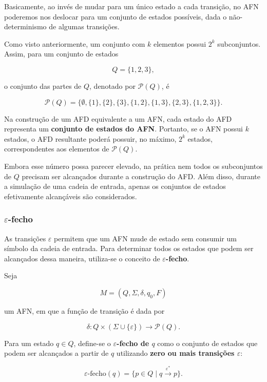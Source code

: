 \documentclass[
  brazilian,
  letterpaper,
]{book}
\theoremstyle{plain}
\theoremstyle{definition}
\theoremstyle{remark}
\begin{document}
Basicamente, ao invés de mudar para um único estado a cada transição, no
AFN poderemos nos deslocar para um conjunto de estados possíveis, dada o
não-determinismo de algumas transições.

Como visto anteriormente, um conjunto com \(k\) elementos possui \(2^k\)
subconjuntos. Assim, para um conjunto de estados

\[
Q=\{1,2,3\},
\]

o conjunto das partes de \(Q\), denotado por \(\mathcal{P}(Q)\), é

\[
\mathcal{P}(Q)=
\{\emptyset,\{1\},\{2\},\{3\},\{1,2\},\{1,3\},\{2,3\},\{1,2,3\}\}.
\]

Na construção de um AFD equivalente a um AFN, cada estado do AFD
representa um \textbf{conjunto de estados do AFN}. Portanto, se o AFN
possui \(k\) estados, o AFD resultante poderá possuir, no máximo,
\(2^k\) estados, correspondentes aos elementos de \(\mathcal{P}(Q)\).

Embora esse número possa parecer elevado, na prática nem todos os
subconjuntos de \(Q\) precisam ser alcançados durante a construção do
AFD. Além disso, durante a simulação de uma cadeia de entrada, apenas os
conjuntos de estados efetivamente alcançáveis são considerados.

\subsubsection{\texorpdfstring{\(\varepsilon\)-fecho}{\textbackslash varepsilon-fecho}}\label{varepsilon-fecho}

As transições \(\varepsilon\) permitem que um AFN mude de estado sem
consumir um símbolo da cadeia de entrada. Para determinar todos os
estados que podem ser alcançados dessa maneira, utiliza-se o conceito de
\textbf{\(\varepsilon\)-fecho}.

Seja

\[
M=(Q,\Sigma,\delta,q_0,F)
\]

um AFN, em que a função de transição é dada por

\[
\delta:Q\times(\Sigma\cup\{\varepsilon\})\rightarrow\mathcal{P}(Q).
\]

Para um estado \(q\in Q\), define-se o \textbf{\(\varepsilon\)-fecho de
\(q\)} como o conjunto de estados que podem ser alcançados a partir de
\(q\) utilizando \textbf{zero ou mais transições \(\varepsilon\)}:

\[
\varepsilon\text{-fecho}(q)
=
\{p\in Q\mid q\overset{\varepsilon^*}{\longrightarrow}p\}.
\]
\end{document}
